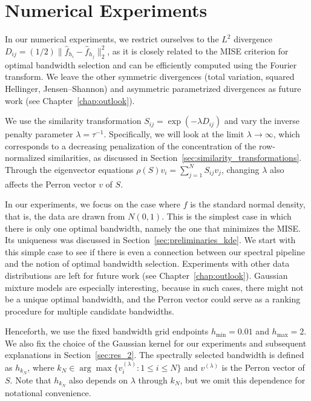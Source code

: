 \section{Numerical Experiments}\label{sec:numerical_experiments}

In our numerical experiments, we restrict ourselves to the $L^2$ divergence $D_{ij}=(1/2)\|\hat{f}_{h_i}-\hat{f}_{h_j}\|_2^2$, as it is closely related to the MISE criterion for optimal bandwidth selection and can be efficiently computed using the Fourier transform. We leave the other symmetric divergences (total variation, squared Hellinger, Jensen--Shannon) and asymmetric parametrized divergences as future work (see Chapter~\ref{chap:outlook}).

We use the similarity transformation $S_{ij}=\exp{(-\lambda D_{ij})}$ and vary the inverse penalty parameter $\lambda=\tau^{-1}$. Specifically, we will look at the limit $\lambda\to\infty$, which corresponds to a decreasing penalization of the concentration of the row-normalized similarities, as discussed in Section~\ref{sec:similarity_transformations}. Through the eigenvector equations $\rho(S)v_i=\sum_{j=1}^{N}S_{ij}v_j$, changing $\lambda$ also affects the Perron vector $v$ of $S$.

In our experiments, we focus on the case where $f$ is the standard normal density, that is, the data are drawn from $N(0,1)$. This is the simplest case in which there is only one optimal bandwidth, namely the one that minimizes the MISE. Its uniqueness was discussed in Section~\ref{sec:preliminaries_kde}. We start with this simple case to see if there is even a connection between our spectral pipeline and the notion of optimal bandwidth selection. Experiments with other data distributions are left for future work (see Chapter~\ref{chap:outlook}). Gaussian mixture models are especially interesting, because in such cases, there might not be a unique optimal bandwidth, and the Perron vector could serve as a ranking procedure for multiple candidate bandwidths.

Henceforth, we use the fixed bandwidth grid endpoints $h_{\min}=0.01$ and $h_{\max}=2$. We also fix the choice of the Gaussian kernel for our experiments and subsequent explanations in Section~\ref{sec:res_2}. The spectrally selected bandwidth is defined as $h_{k_N}$, where $k_N\in\arg\max\{v_i^{(\lambda)}:1\le i\le N\}$ and $v^{(\lambda)}$ is the Perron vector of $S$. Note that $h_{k_N}$ also depends on $\lambda$ through $k_N$, but we omit this dependence for notational convenience.

